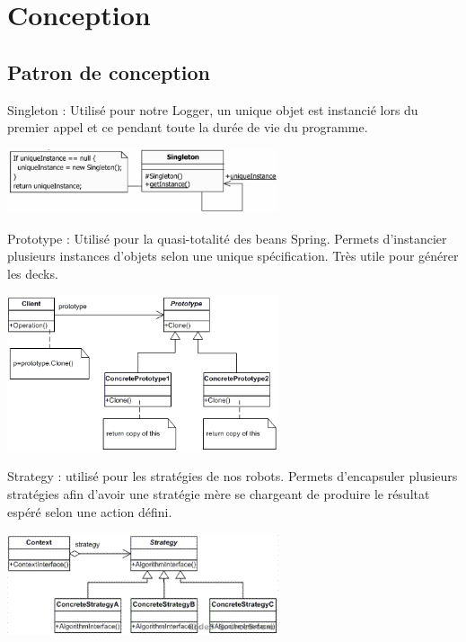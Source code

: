 \chapter{Conception}
\label{conception}

\section{Patron de conception}



Singleton : Utilisé pour notre Logger, un unique objet est instancié lors du premier appel et ce pendant toute la durée de vie du programme.\\
\begin{center}
\includegraphics[width=0.60\textwidth]{./assets/singleton.png}~\\
\end{center}


Prototype : Utilisé pour la quasi-totalité des beans Spring. Permets d'instancier plusieurs instances d'objets selon une unique spécification. Très utile pour générer les decks.\\
\begin{center}
\includegraphics[width=0.60\textwidth]{./assets/prototype.png}~\\
\end{center}


Strategy : utilisé pour les stratégies de nos robots. Permets d'encapsuler plusieurs stratégies afin d'avoir une stratégie mère se chargeant de produire le résultat espéré selon une action défini.\\
\begin{center}
\includegraphics[width=0.60\textwidth]{./assets/strategie.png}
\end{center}
